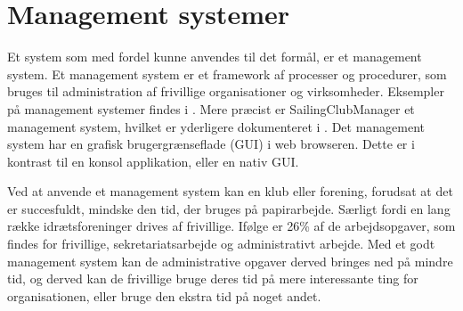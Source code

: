 \section{Management systemer}\label{sec:management-systemer}

Et system som med fordel kunne anvendes til det formål, er et management system. Et management system er et
framework af processer og procedurer, som bruges til administration af frivillige organisationer og
virksomheder. Eksempler på management systemer findes i . Mere præcist er
SailingClubManager et management system, hvilket er yderligere dokumenteret i . Det
management system har en grafisk brugergrænseflade (GUI) i web browseren. Dette er i kontrast til en konsol
applikation, eller en nativ GUI.


Ved at anvende et management system kan en klub eller forening, forudsat at det er succesfuldt, mindske den
tid, der bruges på papirarbejde. Særligt fordi en lang række idrætsforeninger drives af frivillige. Ifølge
\citet{Frivilligrapporten} er 26\% af de arbejdsopgaver, som findes for frivillige, sekretariatsarbejde og
administrativt arbejde. Med et godt management system kan de administrative opgaver derved bringes ned på
mindre tid, og derved kan de frivillige bruge deres tid på mere interessante ting for organisationen, eller
bruge den ekstra tid på noget andet.




